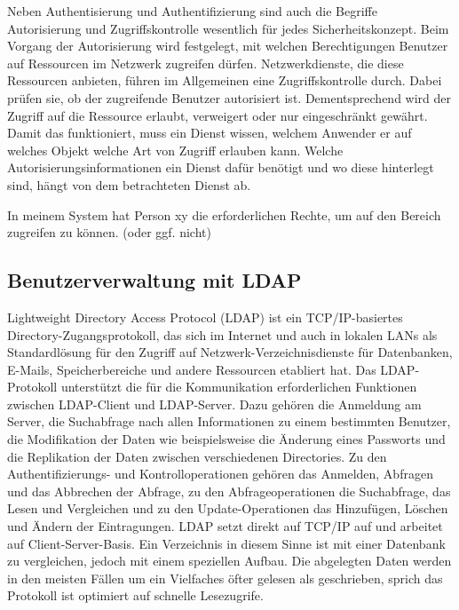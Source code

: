\documentclass[letterpaper, 12pt]{article}
\let\tempsubsection\subsection
\renewcommand\subsection[1]{\vspace{0cm}\tempsubsection{#1}\vspace{0cm}}
\begin{document}
Neben Authentisierung und Authentifizierung sind auch die Begriffe Autorisierung und Zugriffskontrolle wesentlich für jedes Sicherheitskonzept. Beim Vorgang der Autorisierung wird festgelegt, mit welchen Berechtigungen Benutzer auf Ressourcen im Netzwerk zugreifen dürfen. Netzwerkdienste, die diese Ressourcen anbieten, führen im Allgemeinen eine Zugriffskontrolle durch. Dabei prüfen sie, ob der zugreifende Benutzer autorisiert ist. Dementsprechend wird der Zugriff auf die Ressource erlaubt, verweigert oder nur eingeschränkt gewährt. Damit das funktioniert, muss ein Dienst wissen, welchem Anwender er auf welches Objekt welche Art von Zugriff erlauben kann. Welche Autorisierungsinformationen ein Dienst dafür benötigt und wo diese hinterlegt sind, hängt von dem betrachteten Dienst ab. \cite{ausarbeitungauth}

\begin{center}
In meinem System hat Person xy die erforderlichen Rechte, um auf den Bereich zugreifen zu können. (oder ggf. nicht)
\end{center}

\subsection{Benutzerverwaltung mit LDAP}

Lightweight Directory Access Protocol (LDAP) ist ein TCP/IP-basiertes Directory-Zugangsprotokoll, das sich im Internet und auch in lokalen LANs als Standardlösung für den Zugriff auf Netzwerk-Verzeichnisdienste für Datenbanken, E-Mails, Speicherbereiche und andere Ressourcen etabliert hat. Das LDAP-Protokoll unterstützt die für die Kommunikation erforderlichen Funktionen zwischen LDAP-Client und LDAP-Server. Dazu gehören die Anmeldung am Server, die Suchabfrage nach allen Informationen zu einem bestimmten Benutzer, die Modifikation der Daten wie beispielsweise die Änderung eines Passworts und die Replikation der Daten zwischen verschiedenen Directories. Zu den Authentifizierungs- und Kontrolloperationen gehören das Anmelden, Abfragen und das Abbrechen der Abfrage, zu den Abfrageoperationen die Suchabfrage, das Lesen und Vergleichen und zu den Update-Operationen das Hinzufügen, Löschen und Ändern der Eintragungen. LDAP setzt direkt auf TCP/IP auf und arbeitet auf Client-Server-Basis. Ein Verzeichnis in diesem
Sinne ist mit einer Datenbank zu vergleichen, jedoch mit einem speziellen Aufbau. Die
abgelegten Daten werden in den meisten Fällen um ein Vielfaches öfter gelesen als
geschrieben, sprich das Protokoll ist optimiert auf schnelle Lesezugrife. \cite{LDAPInfo} \clearpage
\end{document}
